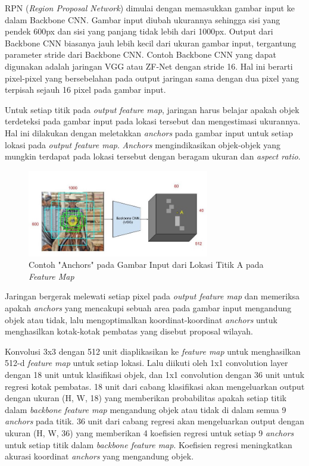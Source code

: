 \documentclass{article}
\begin{document}
  	 \par RPN (\textit{Region Proposal Network}) dimulai dengan memasukkan gambar input ke dalam Backbone CNN. Gambar input diubah ukurannya sehingga sisi yang pendek 600px dan sisi yang panjang tidak lebih dari 1000px. Output dari Backbone CNN biasanya jauh lebih kecil dari ukuran gambar input, tergantung parameter stride dari Backbone CNN. Contoh Backbone CNN yang dapat digunakan adalah jaringan VGG atau ZF-Net dengan stride 16. Hal ini berarti pixel-pixel yang bersebelahan pada output jaringan sama dengan dua pixel yang terpisah sejauh 16 pixel pada gambar input. 
  	 
  	 \par Untuk setiap titik pada \textit{output feature map}, jaringan harus belajar apakah objek terdeteksi pada gambar input pada lokasi tersebut dan mengestimasi ukurannya. Hal ini dilakukan dengan meletakkan \textit{anchors} pada gambar input untuk setiap lokasi pada \textit{output feature map}.\textit{ Anchors }mengindikasikan objek-objek yang mungkin terdapat pada lokasi tersebut dengan beragam ukuran dan \textit{aspect ratio}. 
  	 
  	 \begin{figure}[H]
  	 	\centering
  	 	\includegraphics[width=300px]{arsitektur/contoh_anchor.jpeg}
  	 	\caption{Contoh "Anchors" pada Gambar Input dari Lokasi Titik A pada \textit{Feature Map}}
  	 \end{figure}
   
   	\par Jaringan bergerak melewati setiap pixel pada \textit{output feature map} dan memeriksa apakah \textit{anchors} yang mencakupi sebuah area pada gambar input mengandung objek atau tidak, lalu mengoptimalkan koordinat-koordinat \textit{anchors} untuk menghasilkan kotak-kotak pembatas yang disebut proposal wilayah.
   	
   	\par Konvolusi 3x3 dengan 512 unit diaplikasikan ke \textit{feature map} untuk menghasilkan 512-d \textit{feature map} untuk setiap lokasi. Lalu diikuti oleh 1x1 convolution layer dengan 18 unit untuk klasifikasi objek, dan 1x1 convolution dengan 36 unit untuk regresi kotak pembatas. 18 unit dari cabang klasifikasi akan mengeluarkan output dengan ukuran (H, W, 18) yang memberikan probabilitas apakah setiap titik dalam\textit{ backbone feature map }mengandung objek atau tidak di dalam semua 9 \textit{anchors} pada titik. 36 unit dari cabang regresi akan mengeluarkan output dengan ukuran (H, W, 36) yang memberikan 4 koefisien regresi  untuk setiap 9 \textit{anchors} untuk setiap titik dalam \textit{backbone feature map}. Koefisien regresi meningkatkan akurasi koordinat \textit{anchors} yang mengandung objek.
   	
\end{document}
